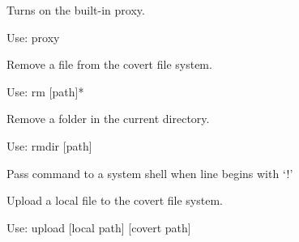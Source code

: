 \documentclass[letterpaper,12pt,openany,oneside]{sphinxmanual}
\begin{document}
\begin{fulllineitems}

\begin{fulllineitems}
\label{console:webStegFS.console.Console.do_proxy}
Turns on the built-in proxy.

Use: proxy

\end{fulllineitems}


\begin{fulllineitems}
\label{console:webStegFS.console.Console.do_rm}
Remove a file from the covert file system.

Use: rm {[}path{]}*

\end{fulllineitems}


\begin{fulllineitems}
\label{console:webStegFS.console.Console.do_rmdir}
Remove a folder in the current directory.

Use: rmdir {[}path{]}

\end{fulllineitems}


\begin{fulllineitems}
\label{console:webStegFS.console.Console.do_shell}
Pass command to a system shell when line begins with `!'

\end{fulllineitems}


\begin{fulllineitems}
\label{console:webStegFS.console.Console.do_upload}
Upload a local file to the covert file system.

Use: upload {[}local path{]} {[}covert path{]}

\end{fulllineitems}



\end{fulllineitems}
\end{document}
